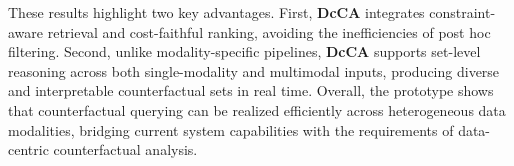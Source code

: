 These results highlight two key advantages. First, \textbf{DcCA} integrates constraint-aware retrieval and cost-faithful ranking, avoiding the inefficiencies of post hoc filtering. Second, unlike modality-specific pipelines, \textbf{DcCA} supports set-level reasoning across both single-modality and multimodal inputs, producing diverse and interpretable counterfactual sets in real time. Overall, the prototype shows that counterfactual querying can be realized efficiently across heterogeneous data modalities, bridging current system capabilities with the requirements of data-centric counterfactual analysis.

